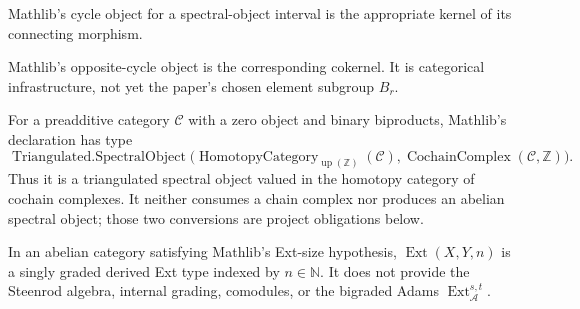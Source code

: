\begin{definition}
  \label{def:mathlib-spectral-object-cycles}
  \mathlibok
  Mathlib's cycle object for a spectral-object interval is the appropriate
  kernel of its connecting morphism.
\end{definition}

\begin{definition}
  \label{def:mathlib-spectral-object-opcycles}
  \mathlibok
  Mathlib's opposite-cycle object is the corresponding cokernel.  It is
  categorical infrastructure, not yet the paper's chosen element subgroup
  $B_r$.
\end{definition}

\begin{definition}
  \label{def:mathlib-mapping-cone-spectral-object}
  \mathlibok
  For a preadditive category $\mathcal C$ with a zero object and binary
  biproducts, Mathlib's declaration has type
  \[
    \operatorname{Triangulated.SpectralObject}
      \bigl(\operatorname{HomotopyCategory}_{\operatorname{up}(\mathbb Z)}
      (\mathcal C),\operatorname{CochainComplex}(\mathcal C,\mathbb Z)\bigr).
  \]
  Thus it is a triangulated spectral object valued in the homotopy category of
  cochain complexes.  It neither consumes a chain complex nor produces an
  abelian spectral object; those two conversions are project obligations below.
\end{definition}

\begin{definition}
  \label{def:mathlib-derived-ext}
  \mathlibok
  In an abelian category satisfying Mathlib's Ext-size hypothesis,
  $\operatorname{Ext}(X,Y,n)$ is a singly graded derived Ext type indexed by
  $n\in\mathbb N$.  It does not provide the Steenrod algebra, internal grading,
  comodules, or the bigraded Adams $\operatorname{Ext}_{\mathcal A}^{s,t}$.
\end{definition}

